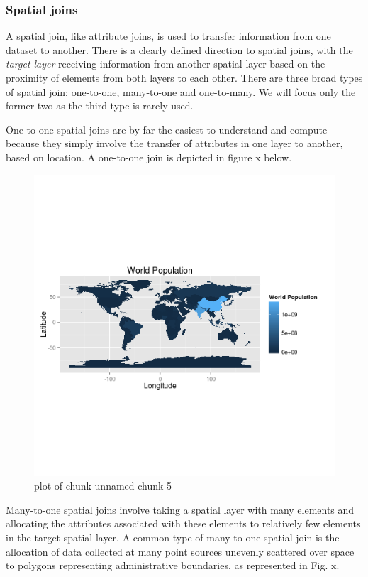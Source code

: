 \documentclass[]{article}
\makeatletter
\def\maxwidth{\ifdim\Gin@nat@width>\linewidth\linewidth
\else\Gin@nat@width\fi}
\let\Oldincludegraphics\includegraphics
\renewcommand{\includegraphics}[1]{\Oldincludegraphics[width=\maxwidth]{#1}}
\makeatother
\begin{document}
\subsubsection{Spatial joins}

A spatial join, like attribute joins, is used to transfer information
from one dataset to another. There is a clearly defined direction to
spatial joins, with the \emph{target layer} receiving information from
another spatial layer based on the proximity of elements from both
layers to each other. There are three broad types of spatial join:
one-to-one, many-to-one and one-to-many. We will focus only the former
two as the third type is rarely used.

One-to-one spatial joins are by far the easiest to understand and
compute because they simply involve the transfer of attributes in one
layer to another, based on location. A one-to-one join is depicted in
figure x below.

\begin{figure}[htbp]
\centering
\includegraphics{figure/unnamed-chunk-5.png}
\caption{plot of chunk unnamed-chunk-5}
\end{figure}

Many-to-one spatial joins involve taking a spatial layer with many
elements and allocating the attributes associated with these elements to
relatively few elements in the target spatial layer. A common type of
many-to-one spatial join is the allocation of data collected at many
point sources unevenly scattered over space to polygons representing
administrative boundaries, as represented in Fig. x.
\end{document}
